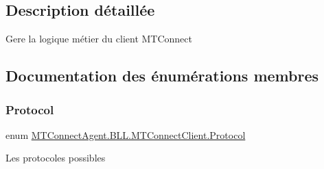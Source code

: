 \subsection{Description détaillée}
Gere la logique métier du client M\+T\+Connect 



\subsection{Documentation des énumérations membres}
\mbox{\label{class_m_t_connect_agent_1_1_b_l_l_1_1_m_t_connect_client_a2f390f74a0ad3ee5147e9438ceed6474}} 
\subsubsection{\texorpdfstring{Protocol}{Protocol}}
{\footnotesize\ttfamily enum \mbox{\hyperlink{class_m_t_connect_agent_1_1_b_l_l_1_1_m_t_connect_client_a2f390f74a0ad3ee5147e9438ceed6474}{M\+T\+Connect\+Agent.\+B\+L\+L.\+M\+T\+Connect\+Client.\+Protocol}}\hspace{0.3cm}{\ttfamily [strong]}}



Les protocoles possibles 

